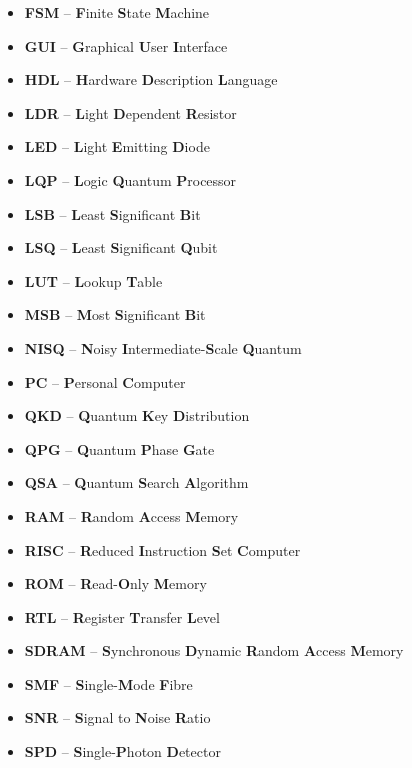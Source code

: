\begin{itemize}
\item {\bf FSM}		-- \textbf{F}inite \textbf{S}tate \textbf{M}achine
\item {\bf GUI}		-- \textbf{G}raphical \textbf{U}ser \textbf{I}nterface
\item {\bf HDL}	    -- \textbf{H}ardware \textbf{D}escription \textbf{L}anguage
\item {\bf LDR}	    -- \textbf{L}ight \textbf{D}ependent \textbf{R}esistor
\item {\bf LED}	    -- \textbf{L}ight \textbf{E}mitting \textbf{D}iode
\item {\bf LQP}	    -- \textbf{L}ogic \textbf{Q}uantum \textbf{P}rocessor
\item {\bf LSB}	    -- \textbf{L}east \textbf{S}ignificant \textbf{B}it
\item {\bf LSQ}	    -- \textbf{L}east \textbf{S}ignificant \textbf{Q}ubit
\item {\bf LUT}	    -- \textbf{L}ookup \textbf{T}able
\item {\bf MSB}	    -- \textbf{M}ost \textbf{S}ignificant \textbf{B}it
\item {\bf NISQ}	-- \textbf{N}oisy \textbf{I}ntermediate-\textbf{S}cale \textbf{Q}uantum
\item {\bf PC}	    -- \textbf{P}ersonal \textbf{C}omputer
\item {\bf QKD}	    -- \textbf{Q}uantum \textbf{K}ey \textbf{D}istribution
\item {\bf QPG}     -- \textbf{Q}uantum \textbf{P}hase \textbf{G}ate
\item {\bf QSA}	    -- \textbf{Q}uantum \textbf{S}earch \textbf{A}lgorithm
\item {\bf RAM}	    -- \textbf{R}andom \textbf{A}ccess \textbf{M}emory
\item {\bf RISC}    -- \textbf{R}educed \textbf{I}nstruction \textbf{S}et \textbf{C}omputer
\item {\bf ROM}	    -- \textbf{R}ead-\textbf{O}nly \textbf{M}emory
\item {\bf RTL}	    -- \textbf{R}egister \textbf{T}ransfer \textbf{L}evel
\item {\bf SDRAM}	-- \textbf{S}ynchronous \textbf{D}ynamic \textbf{R}andom \textbf{A}ccess \textbf{M}emory
\item {\bf SMF}	    -- \textbf{S}ingle-\textbf{M}ode \textbf{F}ibre
\item {\bf SNR}	    -- \textbf{S}ignal to \textbf{N}oise \textbf{R}atio
\item {\bf SPD}	    -- \textbf{S}ingle-\textbf{P}hoton \textbf{D}etector

\end{itemize}
